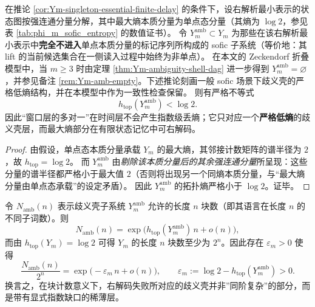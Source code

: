 \begin{corollary}\label{cor:Ym-ambiguity-shell-low-entropy}
在推论 \ref{cor:Ym-singleton-essential-finite-delay} 的条件下，设右解析最小表示的状态图按强连通分量分解，其中最大熵本质分量为单点态分量（其熵为 \(\log 2\)，参见表 \ref{tab:phi_m_sofic_entropy} 的数值证书）。
令 \(Y_m^{\mathrm{amb}}\subset Y_m\) 为那些在该右解析最小表示中\textbf{完全不进入}单点本质分量的标记序列所构成的 sofic 子系统（等价地：其 lift 的当前候选集合在一侧读入过程中始终为非单点）。
在本文的 Zeckendorf 折叠模型中，当 \(m\ge 3\) 时由定理 \ref{thm:Ym-ambiguity-shell-dag} 进一步得到 \(Y_m^{\mathrm{amb}}=\varnothing\)，并参见备注 \ref{rem:Ym-amb-empty}。下述推论刻画一般 sofic 场景下歧义壳的严格低熵结构，并在本模型中作为一致性检查保留。
则有严格不等式
\[
h_{\mathrm{top}}(Y_m^{\mathrm{amb}})<\log 2.
\]
因此“窗口层的多对一”在时间层不会产生指数级丢熵；它只对应一个\textbf{严格低熵}的歧义壳层，而最大熵部分在有限状态记忆中可右解码。
\end{corollary}
\begin{proof}
由假设，单点态本质分量承载 \(Y_m\) 的最大熵，其邻接计数矩阵的谱半径为 \(2\)，故 \(h_{\mathrm{top}}=\log 2\)。
而 \(Y_m^{\mathrm{amb}}\) 由\emph{剔除该本质分量后的其余强连通分量}所呈现：这些分量的谱半径都严格小于最大值 \(2\)（否则将出现另一个同熵本质分量，与“最大熵分量由单点态承载”的设定矛盾）。
因此 \(Y_m^{\mathrm{amb}}\) 的拓扑熵严格小于 \(\log 2\)。证毕。
\end{proof}

\begin{corollary}\label{cor:Ym-ambiguity-shell-exponentially-thin}
令 \(N_{\mathrm{amb}}(n)\) 表示歧义壳子系统 \(Y_m^{\mathrm{amb}}\) 允许的长度 \(n\) 块数（即其语言在长度 \(n\) 的不同子词数）。则
\[
N_{\mathrm{amb}}(n)=\exp\!\bigl(h_{\mathrm{top}}(Y_m^{\mathrm{amb}})\,n+o(n)\bigr),
\]
而由 \(h_{\mathrm{top}}(Y_m)=\log 2\) 可得 \(Y_m\) 的长度 \(n\) 块数至少为 \(2^n\)。因此存在 \(\varepsilon_m>0\) 使得
\[
\frac{N_{\mathrm{amb}}(n)}{2^n}
=
\exp\!\bigl(-\varepsilon_m\,n+o(n)\bigr),
\qquad
\varepsilon_m:=\log 2-h_{\mathrm{top}}(Y_m^{\mathrm{amb}})>0.
\]
换言之，在块计数意义下，右解码失败所对应的歧义壳并非”同阶复杂”的部分，而是带有显式指数缺口的稀薄层。
\end{corollary}

